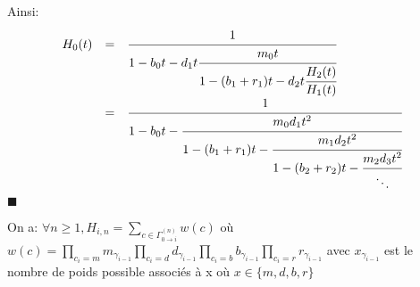			Ainsi:
			\[
			\begin{array}{r c l}
				 H_{0}(t)&=&\cfrac{1}{1-b_{0}t-d_{1}t\cfrac{m_{0}t}{1-(b_{1}+r_{1})t-d_{2}t\cfrac{H_{2}(t)}{H_{1}(t)}}}\\
				 &=&\cfrac{1}{1-b_{0}t-\cfrac{m_{0}d_{1}t^2}{1-(b_{1}+r_{1})t-\cfrac{m_{1}d_{2}t^2}{1-(b_{2}+r_{2})t-\cfrac{m_{2}d_{3}t^2}{\ddots}}}}

			\end{array}
			\]
			$\blacksquare$
		\begin{proposition}
			On a: $\forall n \geq 1, H_{i,n}=\underset{c \in \Gamma^{(n)}_{0 \to i}}{\sum}w(c)$ où $ w(c) = \underset{c_{i}=m}{\prod}m_{\gamma_{i-1}}\underset{c_{i}=d}{\prod}d_{\gamma_{i-1}}\underset{c_{i}=b}{\prod}{b}_{\gamma_{i-1}}\underset{c_{i}=r}{\prod}{r}_{\gamma_{i-1}}$ avec $x_{\gamma_{i-1}}$ est le nombre de poids possible associés à x où $x \in \{m, d, b,r\}$
		\end{proposition}

